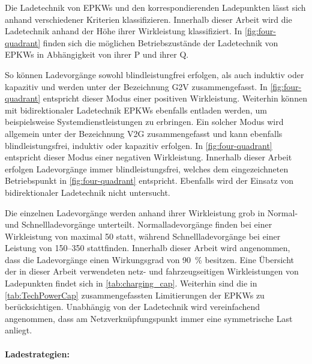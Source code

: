 Die Ladetechnik von \glspl{EPKW} und den korrespondierenden Ladepunkten lässt sich anhand verschiedener Kriterien klassifizieren.
Innerhalb dieser Arbeit wird die Ladetechnik anhand der Höhe ihrer Wirkleistung klassifiziert.
In \autoref{fig:four-quadrant} finden sich die möglichen Betriebszustände der Ladetechnik von \glspl{EPKW} in Abhängigkeit von ihrer \gls{P} und ihrer \gls{Q}.



So können Ladevorgänge sowohl blindleistungfrei erfolgen, als auch induktiv oder kapazitiv und werden unter der Bezeichnung \gls{G2V} zusammengefasst.
In \autoref{fig:four-quadrant} entspricht dieser Modus einer positiven Wirkleistung.
Weiterhin können mit bidirektionaler Ladetechnik \glspl{EPKW} ebenfalls entladen werden, um beispielsweise Systemdienstleistungen zu erbringen.
Ein solcher Modus wird allgemein unter der Bezeichnung \gls{V2G} zusammengefasst und kann ebenfalls blindleistungsfrei, induktiv oder kapazitiv erfolgen.
In \autoref{fig:four-quadrant} entspricht dieser Modus einer negativen Wirkleistung. \cite{He2020} 
Innerhalb dieser Arbeit erfolgen Ladevorgänge immer blindleistungsfrei, welches dem eingezeichneten Betriebspunkt in \autoref{fig:four-quadrant} entspricht.
Ebenfalls wird der Einsatz von bidirektionaler Ladetechnik nicht untersucht.\medskip

Die einzelnen Ladevorgänge werden anhand ihrer Wirkleistung grob in Normal- und Schnellladevorgänge unterteilt.
Normalladevorgänge finden bei einer Wirkleistung von maximal \SI{50}{\kw} statt, während Schnellladevorgänge bei einer Leistung von \SIrange[range-phrase=~{oder}~]{150}{350}{\kw} stattfinden.
Innerhalb dieser Arbeit wird angenommen, dass die Ladevorgänge einen Wirkungsgrad von \SI{90}{\percent} \cite{EliaGroup2020} besitzen.
Eine Übersicht der in dieser Arbeit verwendeten netz- und fahrzeugseitigen Wirkleistungen von Ladepunkten findet sich in \autoref{tab:charging_cap}.
Weiterhin sind die in \autoref{tab:TechPowerCap} zusammengefassten Limitierungen der \glspl{EPKW} zu berücksichtigen.
Unabhängig von der Ladetechnik wird vereinfachend angenommen, dass am Netzverknüpfungspunkt immer eine symmetrische Last anliegt.




\paragraph{Ladestrategien:}

